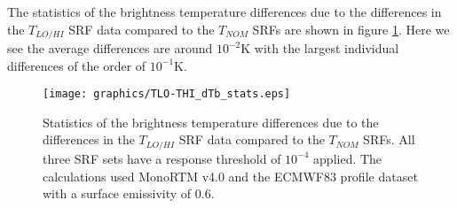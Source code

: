 The statistics of the brightness temperature differences due to the differences in the $T_{LO/HI}$ SRF data compared to the $T_{NOM}$ SRFs are shown in figure \ref{fig:TLO-THI_dTb_stats}. Here we see the average differences are around $10^{-2}$K with the largest individual differences of the order of $10^{-1}$K.

\begin{figure}[H]
  \centering
  \texttt{[image: graphics/TLO-THI\_dTb\_stats.eps]}
  \caption{Statistics of the brightness temperature differences due to the differences in the $T_{LO/HI}$ SRF data compared to the $T_{NOM}$ SRFs. All three SRF sets have a response threshold of $10^{-4}$ applied. The calculations used MonoRTM v4.0 and the ECMWF83 profile dataset with a surface emissivity of 0.6.}
  \label{fig:TLO-THI_dTb_stats}
\end{figure}


\clearpage




\begin{appendix}
  
  
\end{appendix}



